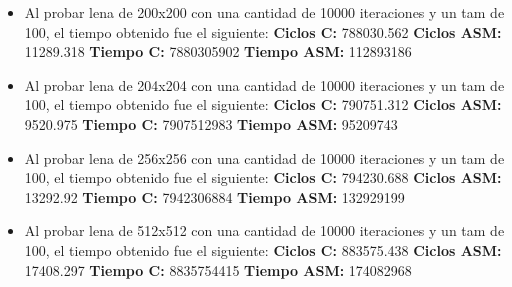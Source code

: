 \documentclass[10pt, a4paper]{article}
\begin{document}
\begin{itemize}
\begin{itemize}
\item{Al probar lena de 200x200 con una cantidad de 10000 iteraciones y un tam de 100, el tiempo obtenido fue el siguiente:\newline
\newline
\textbf{Ciclos C:}                 788030.562\newline
\vspace{0.15cm}
\textbf{Ciclos ASM:}               11289.318\newline
\textbf{Tiempo C:}                 7880305902\newline
\textbf{Tiempo ASM:}               112893186\newline}

\item{Al probar lena de 204x204 con una cantidad de 10000 iteraciones y un tam de 100, el tiempo obtenido fue el siguiente:\newline
\newline
\textbf{Ciclos C:}                 790751.312\newline
\vspace{0.15cm}
\textbf{Ciclos ASM:}                9520.975\newline
\textbf{Tiempo C:}                 7907512983\newline
\textbf{Tiempo ASM:}               95209743\newline}

\item{Al probar lena de 256x256 con una cantidad de 10000 iteraciones y un tam de 100, el tiempo obtenido fue el siguiente:\newline
\newline
\textbf{Ciclos C:}                 794230.688\newline
\vspace{0.15cm}
\textbf{Ciclos ASM:}               13292.92\newline
\textbf{Tiempo C:}                 7942306884\newline
\textbf{Tiempo ASM:}               132929199\newline}


\item{Al probar lena de 512x512 con una cantidad de 10000 iteraciones y un tam de 100, el tiempo obtenido fue el siguiente:\newline
\newline
\textbf{Ciclos C:}                 883575.438\newline
\vspace{0.15cm}
\textbf{Ciclos ASM:}               17408.297\newline
\textbf{Tiempo C:}                 8835754415\newline
\textbf{Tiempo ASM:}               174082968\newline}



\end{itemize}
\end{itemize}
\end{document}
